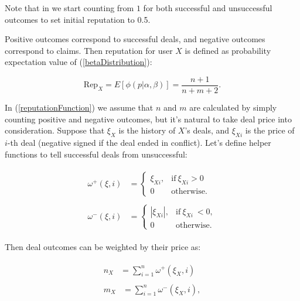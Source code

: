 \documentclass[11pt]{article}
\begin{document}
Note that in \cite{josang2002beta} we start counting from $ 1 $ for both successful and unsuccessful outcomes to set initial reputation to 0.5.

Positive outcomes correspond to successful deals, and negative outcomes correspond to claims. Then  reputation for user $ X $ is defined as probability expectation value of (\ref{betaDistribution}):

\begin{equation} \label{reputationFunction}
\text{Rep}_{X} = E[\phi(p | \alpha, \beta)] = \frac{n + 1}{n + m + 2}.
\end{equation}

In (\ref{reputationFunction}) we assume that $ n $ and $ m $ are calculated by simply counting positive and negative outcomes, but it's natural to take deal price into consideration. Suppose that $ \xi_{X} $ is the history of $ X $'s deals, and $ \xi_{Xi} $ is the price of $ i $-th deal (negative signed if the deal ended in conflict). Let's define helper functions to tell successful deals from unsuccessful:

\begin{align}
\begin{split}
\omega^{+}(\xi, i) {}& = \begin{cases} \xi_{Xi}, & \text{if}\ \xi_{Xi} > 0\, \\ 0 & \mbox{otherwise.} \end{cases}
\end{split} \\
\begin{split}
\omega^{-}(\xi, i) {}& = \begin{cases} |\xi_{Xi}|, & \text{if}\ \xi_{Xi}\ < 0, \\ 0 & \mbox{otherwise.} \end{cases}
\end{split}
\end{align}

Then deal outcomes can be weighted by their price as:

\begin{align}
\begin{split}
n_{X} {} & = \sum_{i = 1}^{n} \omega^{+}(\xi_X, i)
\end{split} \\
\begin{split}
m_{X} {}& = \sum_{i = 1}^{n} \omega^{-}(\xi_X, i), 
\end{split}
\end{align}
\end{document}
